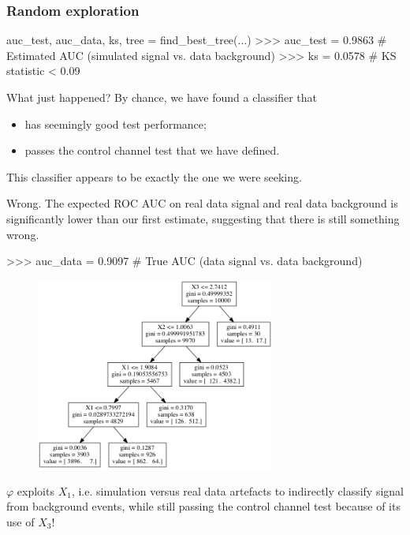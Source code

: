 \documentclass{beamer}
\begin{document}

\begin{frame}[fragile]
\frametitle{Random exploration}

{\scriptsize
\begin{pythoncode}
auc_test, auc_data, ks, tree = find_best_tree(...)
>>> auc_test = 0.9863  # Estimated AUC (simulated signal vs. data background)
>>> ks = 0.0578        # KS statistic < 0.09
\end{pythoncode}
}

\vspace{0.5cm}

What just happened? By chance, we have found a classifier that
\begin{itemize}
\item has seemingly good test performance;
\item passes the control channel test that we have defined.
\end{itemize}
{\color{blue} This classifier appears to be exactly the one we were seeking}.

\vspace{0.5cm}

{\color{red}Wrong}. The expected ROC AUC on real data signal and real
data background is significantly lower than our first estimate, suggesting that
there is still something wrong.

\vspace{0.5cm}

{\scriptsize
\begin{pythoncode}
>>> auc_data = 0.9097  # True AUC (data signal vs. data background)
\end{pythoncode}
}

\end{frame}


\begin{frame}
\begin{figure}
\centering
\includegraphics[width=0.7\textwidth]{figures/tree.png}
\end{figure}

$\varphi$ exploits $X_1$, i.e. simulation versus real data
artefacts to indirectly classify signal from background events, {\color{red}while still passing the
control channel test} because of its use of $X_3$!

\end{frame}
\end{document}
